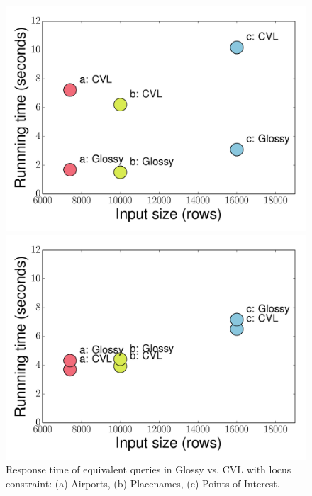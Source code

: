 \documentclass[11pt, oneside]{report}
\begin{document}
\begin{figure}[!t]
     \begin{minipage}{0.32\linewidth}
        \centerline{\includegraphics[width=1\linewidth]{figs-glossy/comparison_glossy_vs_cvl_locus.pdf}}
        \vspace{-3ex}
        \caption{Response time of equivalent queries in Glossy vs. CVL with locus constraint: (a) Airports, (b) Placenames, (c) Points of Interest.}\label{fig:glossy:vs:cvl:locus}
    \end{minipage} \hfill
    \begin{minipage}{0.32\linewidth}
        \centerline{\includegraphics[width=1\linewidth]{figs-glossy/comparison_glossy_vs_cvl_pair.pdf}}
        \vspace{-3ex}

\end{minipage}
\end{figure}
\end{document}
